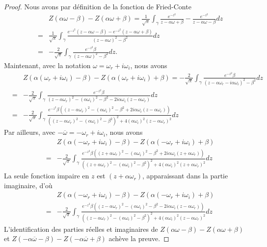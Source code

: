 \begin{proof}
  Nous avons par définition de la fonction de Fried-Conte
  \begin{eqnarray*}
    &&Z(\alpha\omega-\beta)-Z(\alpha\omega+\beta)=\frac{1}{\sqrt{\pi}}\int_\gamma\frac{e^{-z^2}}{z-\alpha\omega+\beta}-\frac{e^{-z^2}}{z-\alpha\omega-\beta}dz\\
    &=&\frac{1}{\sqrt{\pi}}\int_\gamma\frac{e^{-z^2}(z-\alpha\omega-\beta)-e^{-z^2}(z-\alpha\omega+\beta)}{(z-\alpha\omega)^2-\beta^2}dz\\
    &=&-\frac{2}{\sqrt{\pi}}\int_\gamma\frac{e^{-z^2}\beta}{(z-\alpha\omega)^2-\beta^2}dz.
  \end{eqnarray*}
  Maintenant, avec la notation $\omega=\omega_r+i\omega_i$, nous avons
  \begin{eqnarray*}
    &&Z(\alpha(\omega_r+i\omega_i)-\beta)-Z(\alpha(\omega_r+i\omega_i)+\beta)=-\frac{2}{\sqrt{\pi}}\int_\gamma\frac{e^{-z^2}\beta}{(z-\alpha\omega_r-i\alpha\omega_i)^2-\beta^2}dz\\
    &=&-\frac{2}{\sqrt{\pi}}\int_\gamma\frac{e^{-z^2}\beta}{(z-\alpha\omega_r)^2-(\alpha\omega_i)^2-\beta^2-2i\alpha\omega_i(z-\alpha\omega_r)}dz\\
    &=&-\frac{2}{\sqrt{\pi}}\int_\gamma\frac{e^{-z^2}\beta\left((z-\alpha\omega_r)^2-(\alpha\omega_i)^2-\beta^2+2i\alpha\omega_i(z-\alpha\omega_r)\right)}{\left((z-\alpha\omega_r)^2-(\alpha\omega_i)^2-\beta^2\right)^2+4\left(\alpha\omega_i\right)^2(z-\alpha\omega_r)^2}dz
  \end{eqnarray*}
  Par ailleurs, avec $-\overline{\omega}=-\omega_r+i\omega_i$, nous avons
  \begin{eqnarray*}
    &&Z(\alpha(-\omega_r+i\omega_i)-\beta)-Z(\alpha(-\omega_r+i\omega_i)+\beta)\\
    &=&-\frac{2}{\sqrt{\pi}}\int_\gamma\frac{e^{-z^2}\beta\left((z+\alpha\omega_r)^2-(\alpha\omega_i)^2-\beta^2+2i\alpha\omega_i(z+\alpha\omega_r)\right)}{\left((z+\alpha\omega_r)^2-(\alpha\omega_i)^2-\beta^2\right)^2+4\left(\alpha\omega_i\right)^2(z+\alpha\omega_r)^2}dz
  \end{eqnarray*}
  La seule fonction impaire en $z$ est $(z+\alpha\omega_r)$, apparaissant dans la partie imaginaire, d'où
  \begin{eqnarray*}
    &&Z(\alpha(-\omega_r+i\omega_i)-\beta)-Z(\alpha(-\omega_r+i\omega_i)+\beta)\\
    &=&-\frac{2}{\sqrt{\pi}}\int_\gamma\frac{e^{-z^2}\beta\left((z-\alpha\omega_r)^2-(\alpha\omega_i)^2-\beta^2-2i\alpha\omega_i(z-\alpha\omega_r)\right)}{\left((z-\alpha\omega_r)^2-(\alpha\omega_i)^2-\beta^2\right)^2+4\left(\alpha\omega_i\right)^2(z-\alpha\omega_r)^2}dz
  \end{eqnarray*}
  L'identification des parties réelles et imaginaires de $Z(\alpha\omega-\beta)-Z(\alpha\omega+\beta)$ et $Z(-\alpha\overline{\omega}-\beta)-Z(-\alpha\overline{\omega}+\beta)$ achève la preuve.
\end{proof}

